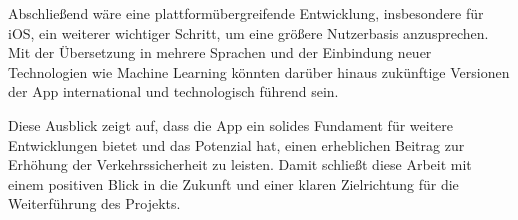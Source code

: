 \documentclass[a4paper, 12pt]{article} %
\begin{document}
\begin{spacing}{1.8}
Abschließend wäre eine plattformübergreifende Entwicklung, insbesondere für iOS, ein weiterer wichtiger Schritt, 
um eine größere Nutzerbasis anzusprechen. Mit der Übersetzung in mehrere Sprachen und der Einbindung neuer Technologien wie
 Machine Learning könnten darüber hinaus zukünftige Versionen der App international und technologisch führend sein.

Diese Ausblick zeigt auf, dass die App ein solides Fundament für weitere Entwicklungen bietet und das Potenzial 
hat, einen erheblichen Beitrag zur Erhöhung der Verkehrssicherheit zu leisten. Damit schließt diese Arbeit mit einem positiven 
Blick in die Zukunft und einer klaren Zielrichtung für die Weiterführung des Projekts.


\end{spacing}

\clearpage
\begingroup
\renewcommand{\bibfont}{\fontsize{13pt}{12pt}\selectfont}  
\sloppy
\nocite{*}
\printbibliography
\endgroup
\end{document}
